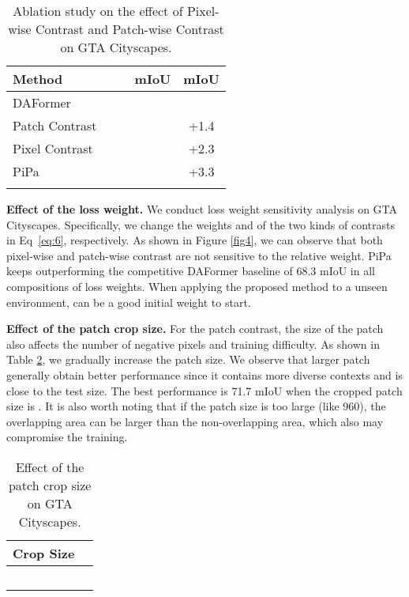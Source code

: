 \documentclass[10pt,twocolumn,letterpaper]{article}
\begin{document}
\begin{table}[t]
    \centering
    \caption{Ablation study on the effect of Pixel-wise Contrast and Patch-wise Contrast on GTA  Cityscapes.} \label{table:ablation}
    \begin{tabular}{l|c|c|c|c}
    \shline
    Method &  &  & mIoU & mIoU\\
    \hline 
    DAFormer\cite{hoyer2022daformer} & & &  &  \\
    Patch Contrast &  &  &  & +1.4 \\
    Pixel Contrast &  & &  & +2.3 \\
    PiPa &  &  &  & +3.3 \\
    \shline
    \end{tabular}
\end{table}

\noindent\textbf{Effect of the loss weight.}
We conduct loss weight sensitivity analysis on GTA  Cityscapes. 
Specifically, we change the weights  and  of the two kinds of contrasts in Eq~\ref{eq:6}, respectively.
As shown in Figure \ref{fig4}, we can observe that both pixel-wise and patch-wise contrast are not sensitive to the relative weight. PiPa keeps outperforming the competitive DAFormer baseline of 68.3 mIoU in all compositions of loss weights. When applying the proposed method to a unseen environment,  can be a good initial weight to start.



\noindent\textbf{Effect of the patch crop size.}
For the patch contrast, the size of the patch also affects the number of negative pixels and training difficulty. As shown in Table \ref{table:crop}, we gradually increase the patch size. We observe that larger patch generally obtain better performance since it contains more diverse contexts and is close to the test size. The best performance is 71.7 mIoU when the cropped patch size is .
It is also worth noting that if the patch size is too large (like 960), the overlapping area can be larger than the non-overlapping area, which also may compromise the training.  



\begin{table}[t]
    \centering
    \caption{Effect of the patch crop size on GTA  Cityscapes.}
    \label{table:crop} \small
    \begin{tabular}{c|c}
    \shline Crop Size &  \\
    \hline 
      &  \\
      &  \\
      &  \\
      &  \\
    \shline
    \end{tabular}
\end{table}
\end{document}
